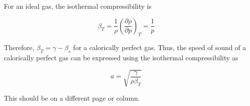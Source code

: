 \documentclass[twocolumn]{article}
\begin{document}
For an ideal gas, the isothermal compressibility is 

\begin{equation}
    \beta_T = \frac{1}{\rho} \left(\frac{\partial \rho}{\partial p} \right)_T = \frac{1}{p}
\end{equation}

Therefore, $\beta_T = \gamma- \beta_s$ for a calorically perfect gas. Thus, the speed of sound of a calorically perfect gas can be expressed using the isothermal compressibility as 

\begin{equation}
    \boxed{a = \sqrt{\frac{\gamma}{\rho \beta_T}}}
    \end{equation}

\pagebreak

\pagebreak
This should be on a different page or column.
\end{document}
